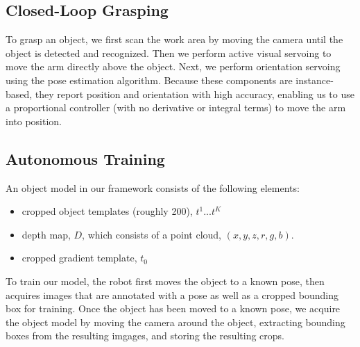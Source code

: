 \documentclass[graybox]{svmult}
\begin{document}
\subsection{Closed-Loop Grasping}

To grasp an object, we first scan the work area by moving the camera
until the object is detected and recognized.  Then we perform active
visual servoing to move the arm directly above the object.  Next, we
perform orientation servoing using the pose estimation
algorithm. Because these components are instance-based, they report
position and orientation with high accuracy, enabling us to use a
proportional controller (with no derivative or integral terms) to move
the arm into position.





\subsection{Autonomous Training}
\label{sec:training}

An object model in our framework consists of the following elements:
\begin{itemize}
\item cropped object templates (roughly 200), $t^1 ... t^K$
\item depth map, $D$, which consists of a point cloud, $(x, y, z, r, g, b)$.
\item cropped gradient template, $t_0$
\end{itemize}

To train our model, the robot first moves the object to a known pose,
then acquires images that are annotated with a pose as well as a
cropped bounding box for training.  Once the object has been moved to
a known pose, we acquire the object model by moving the camera around
the object, extracting bounding boxes from the resulting imgages, and
storing the resulting crops.
\end{document}
